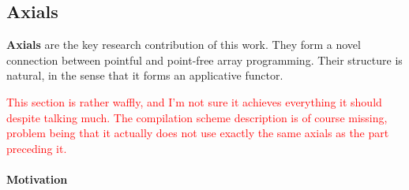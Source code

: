 \subsection{Axials}

\textbf{Axials} are the key research contribution of this work. They form a novel connection between pointful and point-free array programming. Their structure is natural, in the sense that it forms an applicative functor.

\begin{center}
    \textcolor{red}{This section is rather waffly, and I'm not sure it achieves everything it should despite talking much. The compilation scheme description is of course missing, problem being that it actually does not use exactly the same axials as the part preceding it.}
\end{center}


\paragraph{Motivation}


